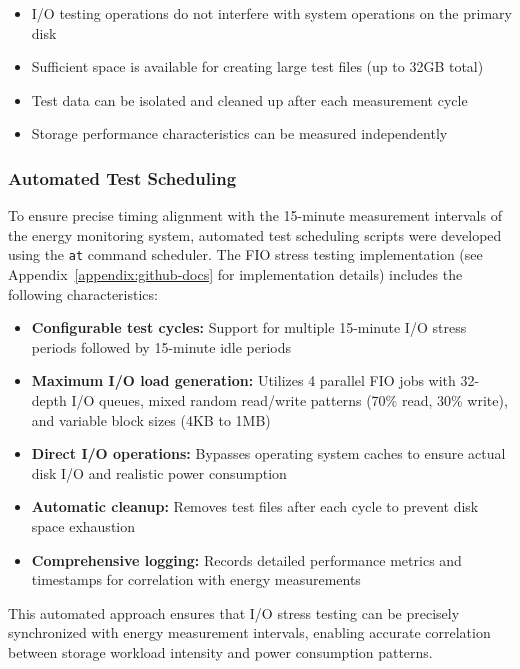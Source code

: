 \begin{itemize}
    \item I/O testing operations do not interfere with system operations on the primary disk
    \item Sufficient space is available for creating large test files (up to 32GB total)
    \item Test data can be isolated and cleaned up after each measurement cycle
    \item Storage performance characteristics can be measured independently
\end{itemize}


\subsubsection{Automated Test Scheduling}
\label{methodology:automated-test-scheduling}
To ensure precise timing alignment with the 15-minute measurement intervals of the energy
monitoring system, automated test scheduling scripts were developed using the \texttt{at}
command scheduler. The FIO stress testing implementation (see Appendix~\ref{appendix:github-docs} 
for implementation details) includes the following characteristics:


\begin{itemize}
    \item \textbf{Configurable test cycles:} Support for multiple 15-minute I/O stress periods
    followed by 15-minute idle periods
    \item \textbf{Maximum I/O load generation:} Utilizes 4 parallel FIO jobs with 32-depth I/O queues,
    mixed random read/write patterns (70\% read, 30\% write), and variable block sizes (4KB to 1MB)
    \item \textbf{Direct I/O operations:} Bypasses operating system caches to ensure actual disk I/O
    and realistic power consumption
    \item \textbf{Automatic cleanup:} Removes test files after each cycle to prevent disk space
    exhaustion
    \item \textbf{Comprehensive logging:} Records detailed performance metrics and timestamps
    for correlation with energy measurements
\end{itemize}

This automated approach ensures that I/O stress testing can be precisely 
synchronized with energy measurement intervals, enabling accurate correlation 
between storage workload intensity and power consumption patterns.